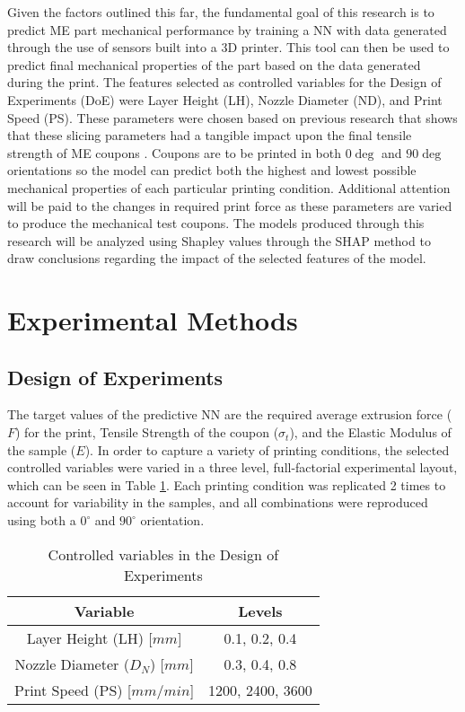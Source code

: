 \documentclass[main.tex]{subfiles}
\begin{document}
Given the factors outlined this far, the fundamental goal of this research is to predict ME part mechanical performance by training a NN with data generated through the use of sensors built into a 3D printer. This tool can then be used to predict final mechanical properties of the part based on the data generated during the print. The features selected as controlled variables for the Design of Experiments (DoE) were Layer Height (LH), Nozzle Diameter (ND), and Print Speed (PS). These parameters were chosen based on previous research that shows that these slicing parameters had a tangible impact upon the final tensile strength of ME coupons \cite{Koch2017, Rankouhi2016}. Coupons are to be printed in both $0\deg$ and $90\deg$ orientations so the model can predict both the highest and lowest possible mechanical properties of each particular printing condition. Additional attention will be paid to the changes in required print force as these parameters are varied to produce the mechanical test coupons. The models produced through this research will be analyzed using Shapley values through the SHAP method to draw conclusions regarding the impact of the selected features of the model.

\section{Experimental Methods} \label{sec:ml_meth}

\subsection{Design of Experiments}\label{ssec:doe}

The target values of the predictive NN are the required average extrusion force ($F$) for the print, Tensile Strength of the coupon ($\sigma_{t}$), and the Elastic Modulus of the sample ($E$). In order to capture a variety of printing conditions, the selected controlled variables were varied in a three level, full-factorial experimental layout, which can be seen in Table \ref{tab:ml_doe}. Each printing condition was replicated 2 times to account for variability in the samples, and all combinations were reproduced using both a $0^{\circ}$ and $90^{\circ}$ orientation.

\begin{table}[!htbp] %
	\renewcommand{\arraystretch}{1.5}
	\centering
	\caption{Controlled variables in the Design of Experiments}
	\begin{tabular}{ c c } 
		\toprule
		\textbf{Variable} & \textbf{Levels} \\
		\midrule
		 Layer Height (LH) [$mm$]  &  0.1, 0.2, 0.4\\
		 Nozzle Diameter ($D_{N}$) [$mm$] & 0.3, 0.4, 0.8\\
		 Print Speed (PS) [$mm/min$] & 1200, 2400, 3600\\
		\bottomrule
	\end{tabular}
	\label{tab:ml_doe}
\end{table}
\end{document}
